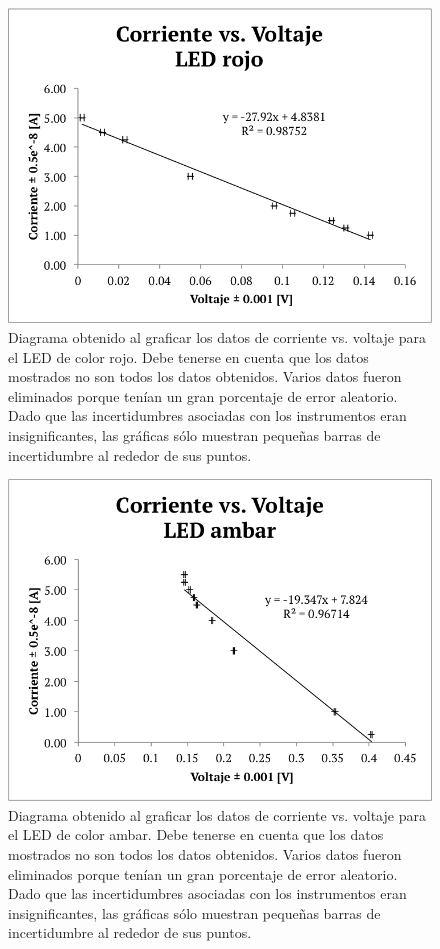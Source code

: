 \documentclass[%
 reprint,
 amsmath,amssymb,
 aps,
]{revtex4-1}
\begin{document}
\begin{figure}[H]
    \centering
    \includegraphics[scale= 0.6]{ROJO.png}
    \caption{Diagrama obtenido al graficar los datos de corriente vs. voltaje para el LED de color rojo. Debe tenerse en cuenta que los datos mostrados no son todos los datos obtenidos. Varios datos fueron eliminados porque tenían un gran porcentaje de error aleatorio. Dado que las incertidumbres asociadas con los instrumentos eran insignificantes, las gráficas sólo muestran pequeñas barras de incertidumbre al rededor de sus puntos.}
    \label{fig:rojo}
\end{figure}

\begin{figure}[H]
    \centering
    \includegraphics[scale= 0.6]{AMBAR.png}
    \caption{Diagrama obtenido al graficar los datos de corriente vs. voltaje para el LED de color ambar. Debe tenerse en cuenta que los datos mostrados no son todos los datos obtenidos. Varios datos fueron eliminados porque tenían un gran porcentaje de error aleatorio. Dado que las incertidumbres asociadas con los instrumentos eran insignificantes, las gráficas sólo muestran pequeñas barras de incertidumbre al rededor de sus puntos.}
    \label{fig:ambar}
\end{figure}
\end{document}
